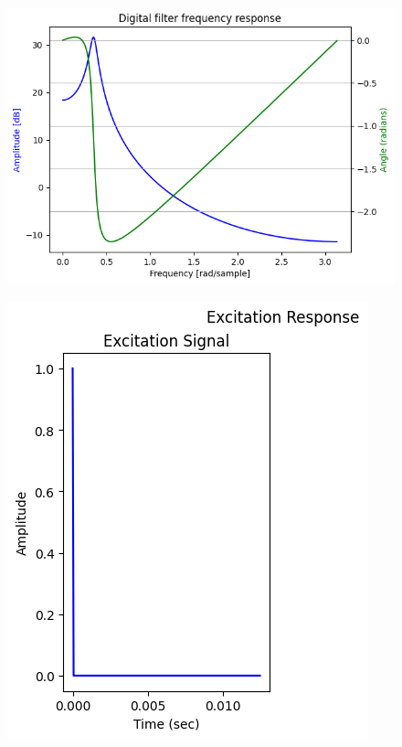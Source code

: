 \documentclass{article}
\begin{document}
\begin{figure}[H]
\begin{center}
\includegraphics[scale = 0.5]{Q1.png}
\end{center}
\end{figure}


\begin{figure}[H]
\begin{center}
\includegraphics[scale = 0.5]{Q1_Signal.png}
\end{center}
\end{figure}
\end{document}
